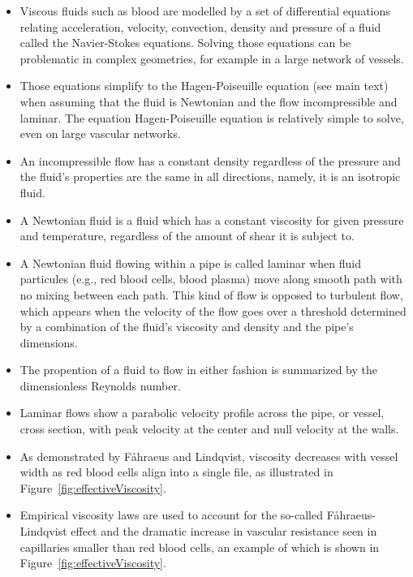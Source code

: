 \documentclass[12pt,a4paper]{journal}
\begin{document}
\begin{tcolorbox}[title=Additional information -- Fluid flow modelling]
  \begin{itemize}
  \item Viscous fluids such as blood are modelled by a set of differential equations relating acceleration, velocity, convection, density and pressure of a fluid called the Navier-Stokes equations.
    Solving those equations can be problematic in complex geometries, for example in a large network of vessels.
  \item Those equations simplify to the Hagen-Poiseuille equation (see main text) when assuming that the fluid is Newtonian and the flow incompressible and laminar.
    The equation Hagen-Poiseuille equation is relatively simple to solve, even on large vascular networks.
  \item An incompressible flow has a constant density regardless of the pressure and the fluid's properties are the same in all directions, namely, it is an isotropic fluid.
  \item A Newtonian fluid is a fluid which has a constant viscosity for given pressure and temperature, regardless of the amount of shear it is subject to.
  \item A Newtonian fluid flowing within a pipe is called laminar when fluid particules (e.g., red blood cells, blood plasma) move along smooth path with no mixing between each path.
    This kind of flow is opposed to turbulent flow, which appears when the velocity of the flow goes over a threshold determined by a combination of the fluid's viscosity and density and the pipe's dimensions.
  \item The propention of a fluid to flow in either fashion is summarized by the dimensionless Reynolds number.
  \item Laminar flows show a parabolic velocity profile across the pipe, or vessel, cross section, with peak velocity at the center and null velocity at the walls.
  \item As demonstrated by F\r ahraeus and Lindqvist, viscosity decreases with vessel width as red blood cells align into a single file, as illustrated in Figure~\ref{fig:effectiveViscosity}.~\cite{Faahraeus_1931}
  \item Empirical viscosity laws are used to account for the so-called F\r ahraeus-Lindqvist effect and the dramatic increase in vascular resistance seen in capillaries smaller than red blood cells, an example of which is shown in Figure~\ref{fig:effectiveViscosity}.~\cite{Haynes_1960,Pries_1990,Secomb_2013}
  \end{itemize}
\end{tcolorbox}
\end{document}
